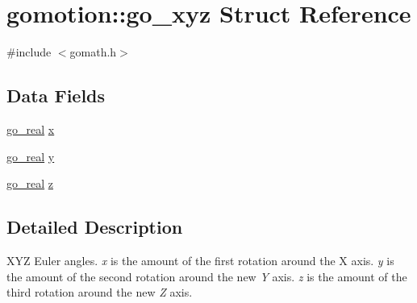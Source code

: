 \hypertarget{structgomotion_1_1go__xyz}{\section{gomotion\-:\-:go\-\_\-xyz Struct Reference}
\label{structgomotion_1_1go__xyz}
}


{\ttfamily \#include $<$gomath.\-h$>$}

\subsection*{Data Fields}
\begin{DoxyCompactItemize}
\item 
\hyperlink{gotypes_8h_afd666a2393eebd71ee455846ac9def9b}{go\-\_\-real} \hyperlink{structgomotion_1_1go__xyz_a469ce91ff180b9f80119faaa2e8c4e08}{x}
\item 
\hyperlink{gotypes_8h_afd666a2393eebd71ee455846ac9def9b}{go\-\_\-real} \hyperlink{structgomotion_1_1go__xyz_a452aa1954ffdfb5400356e60394190bd}{y}
\item 
\hyperlink{gotypes_8h_afd666a2393eebd71ee455846ac9def9b}{go\-\_\-real} \hyperlink{structgomotion_1_1go__xyz_a08df5cfb57694ab8caaec6f989b3f739}{z}
\end{DoxyCompactItemize}


\subsection{Detailed Description}
X\-Y\-Z Euler angles. {\itshape x} is the amount of the first rotation around the X axis. {\itshape y} is the amount of the second rotation around the new {\itshape Y} axis. {\itshape z} is the amount of the third rotation around the new {\itshape Z} axis. 

